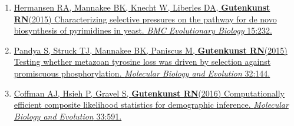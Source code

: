 \documentclass[11pt]{article}
\newcommand{\dadi}{dadi\xspace}
\begin{document}
\begin{enumerate}
\item \href{http://doi.org/10.1186/s12862-015-0515-x}{Hermansen RA\equal, Mannakee BK\trainee\equal, Knecht W, Liberles DA\corresponding, \textbf{Gutenkunst RN}\corresponding (2015) Characterizing selective pressures on the pathway for de novo biosynthesis of pyrimidines in yeast. \emph{BMC Evolutionary Biology} 15:232.}

\item \href{http://doi.org/10.1093/molbev/msu284}{Pandya S\trainee, Struck TJ\trainee, Mannakee BK\trainee, Paniscus M\trainee, \textbf{Gutenkunst RN}\corresponding (2015) Testing whether metazoan tyrosine loss was driven by selection against promiscuous phosphorylation. \emph{Molecular Biology and Evolution} 32:144.}


\item \href{http://doi.org/10.1093/molbev/msv255}{Coffman AJ\trainee, Hsieh P\trainee, Gravel S, \textbf{Gutenkunst RN}\corresponding (2016) Computationally efficient composite likelihood statistics for demographic inference. \emph{Molecular Biology and Evolution} 33:591.}


\end{enumerate}
\end{document}
